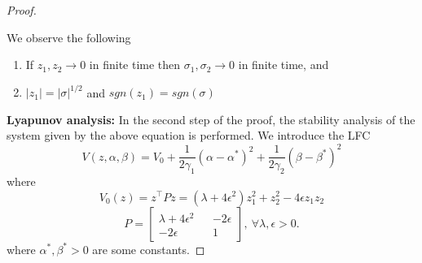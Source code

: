 \begin{proof}

        \begin{rmk}[Observe]
        We observe the following
        \begin{enumerate}
            \item If $z_1, z_2 \to 0$ in finite time then $\sigma_1, \sigma_2 \to 0$ in finite time, and
            \item $|z_1|=|\sigma|^{1/2}$ and $sgn(z_1) = sgn(\sigma)$
        \end{enumerate}
        \end{rmk}

        \textbf{Lyapunov analysis:}
        In the second step of the proof, the stability analysis of the system given by the above equation is performed.
        We introduce the LFC
        \begin{equation}
          V(z, \alpha, \beta) = V_0 + \frac{1}{2\gamma_1}\left(\alpha - \alpha^*\right)^2 + \frac{1}{2\gamma_2}\left(\beta - \beta^*\right)^2
        \end{equation}
        where 
        \begin{equation}
          V_0(z) = z^\top P z = \left(\lambda+4\epsilon^2\right)z_1^2 + z_2^2 - 4\epsilon z_1 z_2
        \end{equation}
        \begin{equation*}
          P = 
          \begin{bmatrix}
            \lambda+4\epsilon^2 && -2\epsilon \\ 
            -2\epsilon && 1
          \end{bmatrix},
          \ \forall \lambda, \epsilon > 0.
        \end{equation*}
        where $\alpha^*, \beta^* > 0$ are some constants.


\end{proof}
